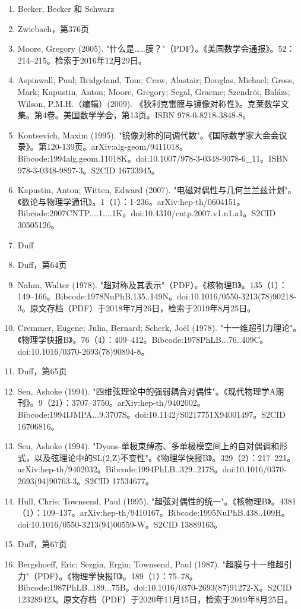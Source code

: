\begin{enumerate}
\item Becker, Becker 和 Schwarz  
\item Zwiebach，第376页  
\item Moore, Gregory (2005). "什么是……膜？"（PDF）。《美国数学会通报》。52：214–215。检索于2016年12月29日。  
\item Aspinwall, Paul; Bridgeland, Tom; Craw, Alastair; Douglas, Michael; Gross, Mark; Kapustin, Anton; Moore, Gregory; Segal, Graeme; Szendröi, Balázs; Wilson, P.M.H.（编辑）(2009). 《狄利克雷膜与镜像对称性》。克莱数学文集。第4卷。美国数学学会，第13页。ISBN 978-0-8218-3848-8。  
\item Kontsevich, Maxim (1995). "镜像对称的同调代数"。《国际数学家大会会议录》。第120-139页。arXiv:alg-geom/9411018。Bibcode:1994alg.geom.11018K。doi:10.1007/978-3-0348-9078-6_11。ISBN 978-3-0348-9897-3。S2CID 16733945。  
\item Kapustin, Anton; Witten, Edward (2007). "电磁对偶性与几何兰兰兹计划"。《数论与物理学通讯》。1（1）：1-236。arXiv:hep-th/0604151。Bibcode:2007CNTP....1....1K。doi:10.4310/cntp.2007.v1.n1.a1。S2CID 30505126。  
\item Duff
\item Duff，第64页  
\item Nahm, Walter (1978). "超对称及其表示"（PDF）。《核物理B》。135（1）：149–166。Bibcode:1978NuPhB.135..149N。doi:10.1016/0550-3213(78)90218-3。原文存档（PDF）于2018年7月26日，检索于2019年8月25日。  
\item Cremmer, Eugene; Julia, Bernard; Scherk, Joël (1978). "十一维超引力理论"。《物理学快报B》。76（4）：409–412。Bibcode:1978PhLB...76..409C。doi:10.1016/0370-2693(78)90894-8。  
\item Duff，第65页  
\item Sen, Ashoke (1994). "四维弦理论中的强弱耦合对偶性"。《现代物理学A期刊》。9（21）：3707–3750。arXiv:hep-th/9402002。Bibcode:1994IJMPA...9.3707S。doi:10.1142/S0217751X94001497。S2CID 16706816。  
\item Sen, Ashoke (1994). "Dyons-单极束缚态、多单极模空间上的自对偶调和形式，以及弦理论中的SL(2,Z)不变性"。《物理学快报B》。329（2）：217–221。arXiv:hep-th/9402032。Bibcode:1994PhLB..329..217S。doi:10.1016/0370-2693(94)90763-3。S2CID 17534677。
\item Hull, Chris; Townsend, Paul (1995). "超弦对偶性的统一"。《核物理B》。4381（1）：109–137。arXiv:hep-th/9410167。Bibcode:1995NuPhB.438..109H。doi:10.1016/0550-3213(94)00559-W。S2CID 13889163。  
\item Duff，第67页  
\item Bergshoeff, Eric; Sezgin, Ergin; Townsend, Paul (1987). "超膜与十一维超引力"（PDF）。《物理学快报B》。189（1）：75–78。Bibcode:1987PhLB..189...75B。doi:10.1016/0370-2693(87)91272-X。S2CID 123289423。原文存档（PDF）于2020年11月15日，检索于2019年8月25日。  

\end{enumerate}
